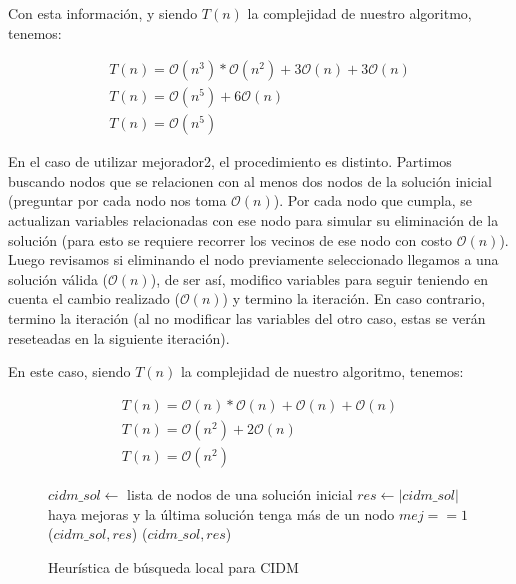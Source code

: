 Con esta información, y siendo $T(n)$ la complejidad de nuestro algoritmo, tenemos:

\begin{equation*}
\begin{array}{l}
T(n) = \mathcal{O}(n^3) * \mathcal{O}(n^2) + 3\mathcal{O}(n) + 3\mathcal{O}(n) \\
T(n) = \mathcal{O}(n^5) + 6\mathcal{O}(n) \\
T(n) = \mathcal{O}(n^5)
\end{array}
\end{equation*}

En el caso de utilizar mejorador2, el procedimiento es distinto. Partimos buscando nodos que se relacionen con al menos dos nodos de la solución inicial (preguntar por cada nodo nos toma $\mathcal{O}(n)$). Por cada nodo que cumpla, se actualizan variables relacionadas con ese nodo para simular su eliminación de la solución (para esto se requiere recorrer los vecinos de ese nodo con costo $\mathcal{O}(n)$). Luego revisamos si eliminando el nodo previamente seleccionado llegamos a una solución válida ($\mathcal{O}(n)$), de ser así, modifico variables para seguir teniendo en cuenta el cambio realizado ($\mathcal{O}(n)$) y termino la iteración. En caso contrario, termino la iteración (al no modificar las variables del otro caso, estas se verán reseteadas en la siguiente iteración).

En este caso, siendo $T(n)$ la complejidad de nuestro algoritmo, tenemos:

\begin{equation*}
\begin{array}{l}
T(n) = \mathcal{O}(n) * \mathcal{O}(n) + \mathcal{O}(n) + \mathcal{O}(n)\\
T(n) = \mathcal{O}(n^2) + 2\mathcal{O}(n) \\
T(n) = \mathcal{O}(n^2)
\end{array}
\end{equation*}

\vspace*{0.3cm}

\begin{figure}
\begin{codebox}
\li $cidm\_sol \leftarrow$ lista de nodos de una solución inicial
\li $res \leftarrow |cidm\_sol|$
\li \While haya mejoras y la última solución tenga más de un nodo
\li \Do 
		\If $mej == 1$
\li 		{}($cidm\_sol,res$)
\li 		{}($cidm\_sol,res$)
		\End
	\End
\end{codebox}
\caption{Heurística de búsqueda local para CIDM}\label{code:busqueda}
\end{figure}


